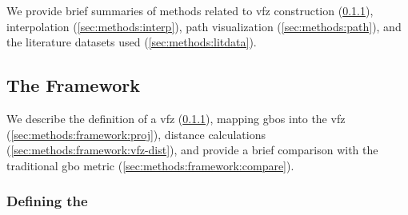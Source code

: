 \documentclass[final,twocolumn,12pt]{elsarticle}
\begin{document}
	We provide brief summaries of methods related to \gls{vfz} construction  (\cref{sec:methods:framework:vfz}), interpolation (\cref{sec:methods:interp}), path visualization (\cref{sec:methods:path}), and the literature datasets used (\cref{sec:methods:litdata}).
	
	\subsection{The  Framework}
	\label{sec:methods:framework}

    We describe the definition of a \gls{vfz} (\cref{sec:methods:framework:vfz}), mapping \glspl{gbo} into the \gls{vfz} (\cref{sec:methods:framework:proj}), distance calculations (\cref{sec:methods:framework:vfz-dist}), and provide a brief comparison with the traditional \gls{gbo} metric (\cref{sec:methods:framework:compare}).
%
%
	\subsubsection{Defining the }
	\label{sec:methods:framework:vfz}
	
\end{document}

